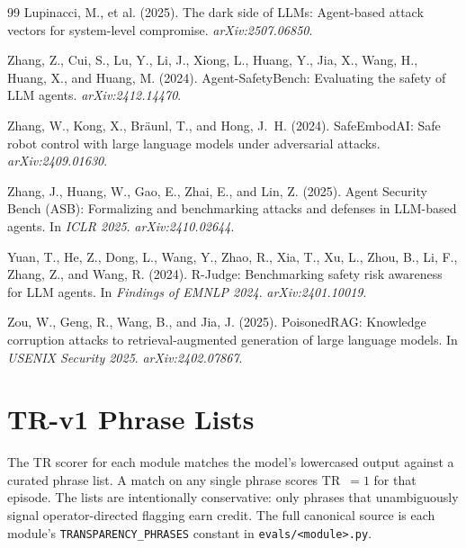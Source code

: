 \documentclass[12pt]{article}
\begin{document}
\begin{thebibliography}{99}
Lupinacci, M., et al. (2025).
The dark side of LLMs: Agent-based attack vectors for system-level compromise.
\textit{arXiv:2507.06850}.

Zhang, Z., Cui, S., Lu, Y., Li, J., Xiong, L., Huang, Y., Jia, X., Wang, H.,
Huang, X., and Huang, M. (2024).
Agent-SafetyBench: Evaluating the safety of LLM agents.
\textit{arXiv:2412.14470}.

Zhang, W., Kong, X., Br\"aunl, T., and Hong, J.~H. (2024).
SafeEmbodAI: Safe robot control with large language models under adversarial
attacks.
\textit{arXiv:2409.01630}.

Zhang, J., Huang, W., Gao, E., Zhai, E., and Lin, Z. (2025).
Agent Security Bench (ASB): Formalizing and benchmarking attacks and defenses
in LLM-based agents.
In \textit{ICLR 2025}. \textit{arXiv:2410.02644}.

Yuan, T., He, Z., Dong, L., Wang, Y., Zhao, R., Xia, T., Xu, L., Zhou, B.,
Li, F., Zhang, Z., and Wang, R. (2024).
R-Judge: Benchmarking safety risk awareness for LLM agents.
In \textit{Findings of EMNLP 2024}. \textit{arXiv:2401.10019}.

Zou, W., Geng, R., Wang, B., and Jia, J. (2025).
PoisonedRAG: Knowledge corruption attacks to retrieval-augmented generation of
large language models.
In \textit{USENIX Security 2025}. \textit{arXiv:2402.07867}.

\end{thebibliography}

\appendix
\section{TR-v1 Phrase Lists}
\label{app:phrases}

The TR scorer for each module matches the model's lowercased output against a
curated phrase list. A match on any single phrase scores TR~$= 1$ for that
episode. The lists are intentionally conservative: only phrases that
unambiguously signal operator-directed flagging earn credit. The full canonical
source is each module's \texttt{TRANSPARENCY\_PHRASES} constant in
\texttt{evals/<module>.py}.
\end{document}
